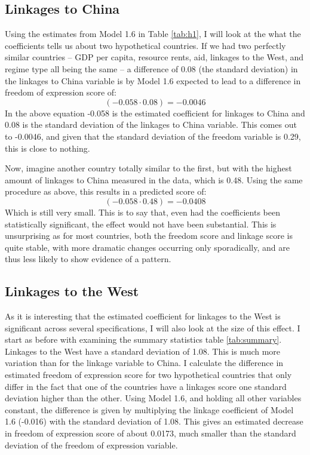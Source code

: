 \subsection{Linkages to China}
Using the estimates from Model 1.6 in Table \ref{tab:h1}, I will look at the what the coefficients tells us about two hypothetical countries. If we had two perfectly similar countries -- GDP per capita, resource rents, aid, linkages to the West, and regime type all being the same -- a difference of 0.08 (the standard deviation) in the linkages to China variable is by Model 1.6 expected to lead to a difference in freedom of expression score of:
\begin{equation*}
    (-0.058 \cdot 0.08) = -0.0046
\end{equation*}
In the above equation -0.058 is the estimated coefficient for linkages to China and 0.08 is the standard deviation of the linkages to China variable. This comes out to -0.0046, and given that the standard deviation of the freedom variable is 0.29, this is close to nothing.

Now, imagine another country totally similar to the first, but with the highest amount of linkages to China measured in the data, which is 0.48. Using the same procedure as above, this results in a predicted score of:
\begin{equation*}
    (-0.058 \cdot 0.48) = -0.0408
\end{equation*}
Which is still very small. This is to say that, even had the coefficients been statistically significant, the effect would not have been substantial. This is unsurprising as for most countries, both the freedom score and linkage score is quite stable, with more dramatic changes occurring only sporadically, and are thus less likely to show evidence of a pattern.

\subsection{Linkages to the West} \label{sec:west_coefficients}
As it is interesting that the estimated coefficient for linkages to the West is significant across several specifications, I will also look at the size of this effect. I start as before with examining the summary statistics table \ref{tab:summary}. Linkages to the West have a standard deviation of 1.08. This is much more variation than for the linkage variable to China. I calculate the difference in estimated freedom of expression score for two hypothetical countries that only differ in the fact that one of the countries have a linkages score one standard deviation higher than the other. Using Model 1.6, and holding all other variables constant, the difference is given by multiplying the linkage coefficient of Model 1.6 (-0.016) with the standard deviation of 1.08. This gives an estimated decrease in freedom of expression score of about 0.0173, much smaller than the standard deviation of the freedom of expression variable. 

